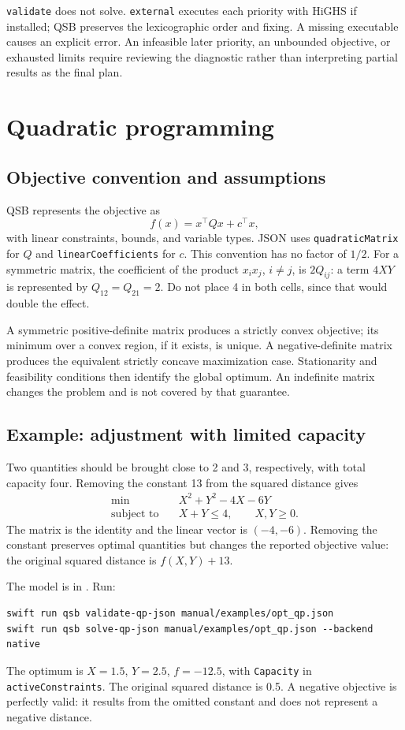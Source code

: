 \texttt{validate} does not solve. \texttt{external} executes each priority
with HiGHS if installed; QSB preserves the lexicographic order and fixing.
A missing executable causes an explicit error. An infeasible later priority,
an unbounded objective, or exhausted limits require reviewing the diagnostic
rather than interpreting partial results as the final plan.

\section{Quadratic programming}
\subsection{Objective convention and assumptions}
QSB represents the objective as
\[
 f(x)=x^\top Qx+c^\top x,
\]
with linear constraints, bounds, and variable types. JSON uses
\texttt{quadraticMatrix} for \(Q\) and \texttt{linearCoefficients} for \(c\).
This convention has no factor of \(1/2\). For a symmetric matrix, the
coefficient of the product \(x_ix_j\), \(i\ne j\), is \(2Q_{ij}\): a term
\(4XY\) is represented by \(Q_{12}=Q_{21}=2\). Do not place 4 in both
cells, since that would double the effect.

A symmetric positive-definite matrix produces a strictly convex objective;
its minimum over a convex region, if it exists, is unique. A negative-definite
matrix produces the equivalent strictly concave maximization case.
Stationarity and feasibility conditions then identify the global optimum.
An indefinite matrix changes the problem and is not covered by that guarantee.

\subsection{Example: adjustment with limited capacity}
Two quantities should be brought close to 2 and 3, respectively, with total
capacity four. Removing the constant 13 from the squared distance gives
\[
\begin{aligned}
 \min\quad & X^2+Y^2-4X-6Y\\
 \text{subject to}\quad &X+Y\leq4,\qquad X,Y\geq0.
\end{aligned}
\]
The matrix is the identity and the linear vector is \((-4,-6)\). Removing
the constant preserves optimal quantities but changes the reported objective
value: the original squared distance is \(f(X,Y)+13\).

The model is in . Run:
\begin{lstlisting}
swift run qsb validate-qp-json manual/examples/opt_qp.json
swift run qsb solve-qp-json manual/examples/opt_qp.json --backend native
\end{lstlisting}
The optimum is \(X=1.5\), \(Y=2.5\), \(f=-12.5\), with
\texttt{Capacity} in \texttt{activeConstraints}. The original squared distance
is 0.5. A negative objective is perfectly valid: it results from the omitted
constant and does not represent a negative distance.

